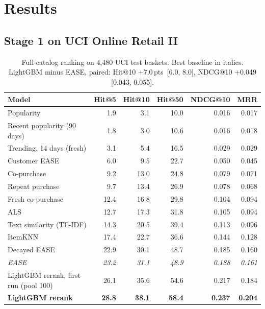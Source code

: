 \documentclass[11pt]{article}
\newcommand{\pts}{\,pts}
\begin{document}
\section{Results}

\subsection{Stage 1 on UCI Online Retail II}\label{sec:s1}

\begin{table}[t]
\centering
\caption{Full-catalog ranking on 4,480 UCI test baskets. Best baseline in italics. LightGBM minus EASE, paired: Hit@10 +7.0\pts\ [6.0, 8.0], NDCG@10 +0.049 [0.043, 0.055].}
\label{tab:stage1}
\begin{tabular}{lrrrrr}
\toprule
Model & Hit@5 & Hit@10 & Hit@50 & NDCG@10 & MRR \\
\midrule
Popularity & 1.9 & 3.1 & 10.0 & 0.016 & 0.017 \\
Recent popularity (90 days) & 1.8 & 3.0 & 10.6 & 0.016 & 0.018 \\
Trending, 14 days (fresh) & 3.1 & 5.4 & 16.5 & 0.029 & 0.029 \\
Customer EASE & 6.0 & 9.5 & 22.7 & 0.050 & 0.045 \\
Co-purchase & 9.2 & 13.0 & 24.8 & 0.079 & 0.071 \\
Repeat purchase & 9.7 & 13.4 & 26.9 & 0.078 & 0.068 \\
Fresh co-purchase & 12.4 & 16.8 & 29.8 & 0.104 & 0.094 \\
ALS & 12.7 & 17.3 & 31.8 & 0.105 & 0.094 \\
Text similarity (TF-IDF) & 14.3 & 20.5 & 39.4 & 0.113 & 0.096 \\
ItemKNN & 17.4 & 22.7 & 36.6 & 0.144 & 0.128 \\
Decayed EASE & 22.9 & 30.1 & 48.7 & 0.185 & 0.160 \\
\textit{EASE} & \textit{23.2} & \textit{31.1} & \textit{48.9} & \textit{0.188} & \textit{0.161} \\
LightGBM rerank, first run (pool 100) & 26.1 & 35.6 & 54.6 & 0.217 & 0.184 \\
\textbf{LightGBM rerank} & \textbf{28.8} & \textbf{38.1} & \textbf{58.4} & \textbf{0.237} & \textbf{0.204} \\
\bottomrule
\end{tabular}
\end{table}
\end{document}
